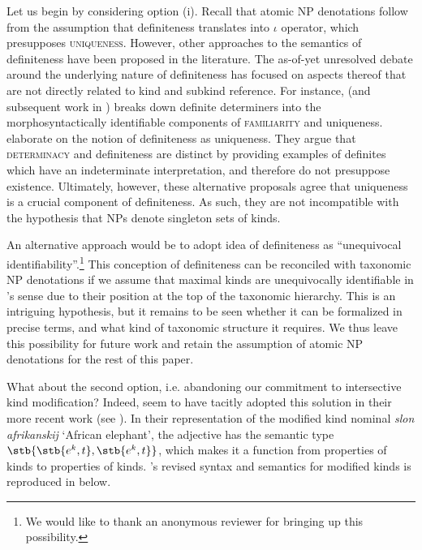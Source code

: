 \documentclass[output=paper]{langscibook}
\begin{document}
Let us begin by considering option (i). Recall that atomic NP denotations follow from the assumption that definiteness translates into  $\iota$ operator, which presupposes \textsc{uniqueness}. However, other approaches to the semantics of definiteness have been proposed in the literature. The as-of-yet unresolved debate around the underlying nature of definiteness has focused on aspects thereof that are not directly related to kind and subkind reference. For instance, \citet{Schwarz2009} (and subsequent work in \citealt{Schwarz2013}) breaks down definite determiners into the morphosyntactically identifiable components of \textsc{familiarity} and uniqueness. \citet{Coppock.Beaver2014,Coppock.Beaver2015} elaborate on the notion of definiteness as uniqueness. They argue that \textsc{determinacy} and definiteness are distinct by providing examples of definites which have an indeterminate interpretation, and therefore do not presuppose existence. Ultimately, however, these alternative proposals agree that uniqueness is a crucial component of definiteness. As such, they are not incompatible with the hypothesis that NPs denote singleton sets of kinds.

An alternative approach would be to adopt  idea of definiteness as ``unequivocal identifiability''.\footnote{We would like to thank an anonymous reviewer for bringing up this possibility.} This conception of definiteness can be reconciled with taxonomic NP denotations if we assume that maximal kinds are unequivocally identifiable in \citeauthor{Lobner1985}'s sense due to their position at the top of the taxonomic hierarchy. This is an intriguing hypothesis, but it remains to be seen whether it can be formalized in precise terms, and what kind of taxonomic structure it requires. We thus leave this possibility for future work and retain the assumption of atomic NP denotations for the rest of this paper.

What about the second option, i.e. abandoning our commitment to intersective kind modification? Indeed, \citeauthor{Borik.Espinal2012} seem to have tacitly adopted this solution in their more recent work (see \citealt{Borik.Espinal2016, Borik.Espinal2018}). In their representation of the  modified kind nominal \textit{slon afrikanskij} `African elephant', the adjective has the semantic type $\stb{\stb{e^k,t},\stb{e^k,t}}$, which makes it a function from properties of kinds to properties of kinds. \citeauthor{Borik.Espinal2012}'s revised syntax and semantics for modified kinds is reproduced in  below.
\end{document}

